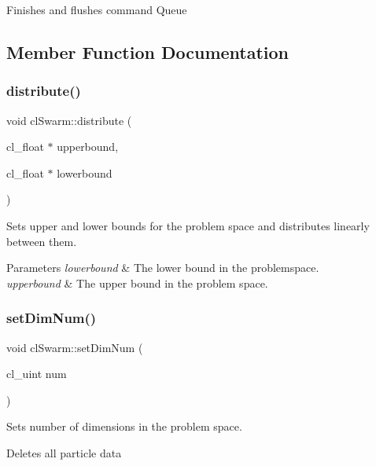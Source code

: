 Finishes and flushes command Queue 

\subsection{Member Function Documentation}
\mbox{\label{classclSwarm_a404f5c648630225042eed1b741f02997}} 
\subsubsection{\texorpdfstring{distribute()}{distribute()}}
{\footnotesize\ttfamily void cl\+Swarm\+::distribute (\begin{DoxyParamCaption}\item[{cl\+\_\+float $\ast$}]{upperbound,  }\item[{cl\+\_\+float $\ast$}]{lowerbound }\end{DoxyParamCaption})}



Sets upper and lower bounds for the problem space and distributes linearly between them. 


\begin{DoxyParams}{Parameters}
{\em lowerbound} & The lower bound in the problemspace. \\
\hline
{\em upperbound} & The upper bound in the problem space. \\
\hline
\end{DoxyParams}
\mbox{\label{classclSwarm_a2329aed460d32c0d20c5baa54af5d673}} 
\subsubsection{\texorpdfstring{set\+Dim\+Num()}{setDimNum()}}
{\footnotesize\ttfamily void cl\+Swarm\+::set\+Dim\+Num (\begin{DoxyParamCaption}\item[{cl\+\_\+uint}]{num }\end{DoxyParamCaption})}



Sets number of dimensions in the problem space. 

Deletes all particle data \mbox{\label{classclSwarm_ab9e5dbb1c3f411d1dd412c6119694106}} 
